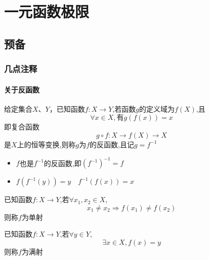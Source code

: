 \chapter{一元函数极限}
\section{预备}
\subsection{几点注释}
\subsubsection{关于反函数}

\begin{definition}[反函数]
    给定集合$X$、$Y$，已知函数$f:X\rightarrow Y$,若函数$g$的定义域为$f(X)$,且
    \begin{equation*}
        \forall x\in X,有g(f(x))=x
    \end{equation*}
    即复合函数
    \begin{equation*}
        g\circ f:X\rightarrow f(X) \rightarrow X
    \end{equation*}是$X$上的恒等变换,则称$g$为$f$的反函数,且记$g=f^{-1}$
\end{definition}

\begin{note}
    \begin{itemize}
        \item $f$也是$f^{-1}$的反函数,即$(f^{-1})^{-1}=f$
        \item $f(f^{-1}(y))=y \quad f^{-1}(f(x))=x$\label{反函数性质}
    \end{itemize}
\end{note}

\begin{definition}[单射]
    已知函数$f:X\rightarrow Y$,若$\forall x_1,x_2 \in X$,
    \begin{equation*}
        x_1\ne x_2\Longrightarrow f(x_1)\ne f(x_2)
    \end{equation*}
    则称$f$为单射
\end{definition}

\begin{definition}[满射]
    已知函数$f:X\rightarrow Y$,若$\forall y \in Y$,
    \begin{equation*}
        \exists x \in X , f(x)=y
    \end{equation*}
    则称$f$为满射
\end{definition}

